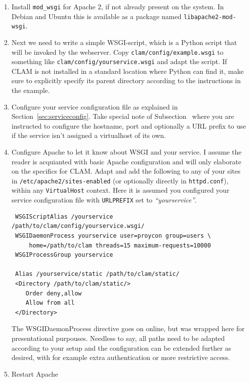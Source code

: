 \documentclass[a4paper,12pt]{report}
\begin{document}
\begin{enumerate}
\item Install \texttt{mod\_wsgi} for Apache 2, if not already present on the system. In Debian and Ubuntu this is available as a package named \texttt{libapache2-mod-wsgi}.
\item Next we need to write a simple WSGI-script, which is a Python script that will be invoked by the webserver. Copy \texttt{clam/config/example.wsgi} to something like  \texttt{clam/config/yourservice.wsgi} and adapt the script. If CLAM is not installed in a standard location where Python can find it, make sure to explicitly specify its parent directory according to the instructions in the example.
\item Configure your service configuration file as explained in Section~\ref{sec:serviceconfig}. Take special note of Subsection~\label{sec:sadmin} where you are instructed to configure the hostname, port and optionally a URL prefix to use if the service isn't assigned a virtualhost of its own.
\item Configure Apache to let it know about WSGI and your service. I assume the reader is acquianted with basic Apache configuration and will only elaborate on the specifics for CLAM. Adapt and add the following to any of your sites in \texttt{/etc/apache2/sites-enabled} (or optionally directly in \texttt{httpd.conf}), within any \texttt{VirtualHost} context. Here it is assumed you configured your service configuration file with \texttt{URLPREFIX} set to \emph{``yourservice''}.

\begin{verbatim}
 WSGIScriptAlias /yourservice /path/to/clam/config/yourservice.wsgi/
 WSGIDaemonProcess yourservice user=proycon group=users \
     home=/path/to/clam threads=15 maximum-requests=10000
 WSGIProcessGroup yourservice

 Alias /yourservice/static /path/to/clam/static/
 <Directory /path/to/clam/static/>
    Order deny,allow
    Allow from all
 </Directory>
\end{verbatim}

The WSGIDaemonProcess directive goes on online, but was wrapped here for presentational purpouses. Needless to say, all paths need to be adapted according to your setup and the configuration can be extended further as desired, with for example extra authentication or more restrictive access. 

\item Restart Apache
\end{enumerate}
\end{document}
